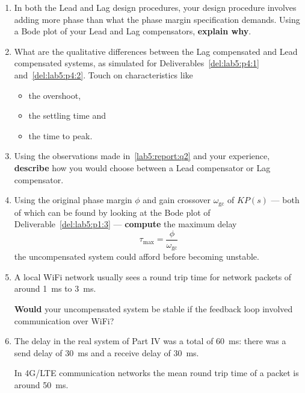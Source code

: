 \begin{deliverable}[label={lab5:report}]
  \begin{enumerate}[label={(\arabic*)}]
    \item{%
      In both the Lead and Lag design procedures, your design procedure involves adding more phase than what the phase margin specification demands.
      Using a Bode plot of your Lead and Lag compensators, \textbf{explain why}.
      \label{lab5:report:q1}
    }
    \item{%
      What are the qualitative differences between the Lag compensated and Lead compensated systems, as simulated for Deliverables~\ref{del:lab5:p4:1} and~\ref{del:lab5:p4:2}.
      Touch on characteristics like
      \begin{itemize}
        \item{
          the overshoot,
        }
        \item{
          the settling time and
        }
        \item{
          the time to peak.
        }
      \end{itemize}
      \label{lab5:report:q2}
    }
    \item{%
      Using the observations made in~\ref{lab5:report:q2} and your experience, \textbf{describe} how you would choose between a Lead compensator or Lag compensator.
      \label{lab5:report:q3}
    }
    \item{%
      Using the original phase margin \(\phi\) and gain crossover \(\omega_\mathrm{gc}\) of \(K P(s)\) --- both of which can be found by looking at the Bode plot of Deliverable~\ref{del:lab5:p1:3} --- \textbf{compute} the maximum delay
      \[
        \tau_\mathrm{max} = \frac{\phi}{\omega_\mathrm{gc}}
      \]
      the uncompensated system could afford before becoming unstable.
      \label{lab5:report:q4}
    }
    \item{%
      A local WiFi network usually sees a round trip time for network packets of around \SI{1}{\milli\second} to \SI{3}{\milli\second}.

      \textbf{Would} your uncompensated system be stable if the feedback loop involved communication over WiFi?
      \label{lab5:report:q5}
    }
    \item{%
      The delay in the real system of Part IV was a total of \SI{60}{\milli\second}:
      there was a send delay of \SI{30}{\milli\second} and a receive delay of \SI{30}{\milli\second}.

      In 4G/LTE communication networks the mean round trip time of a packet is around \SI{50}{\milli\second}.

}
\end{enumerate}
\end{deliverable}
